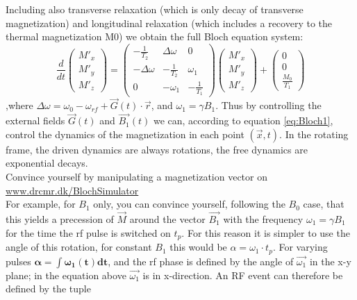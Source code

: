 \documentclass[a4paper,12pt]{extarticle}
\begin{document}
 Including also transverse relaxation (which is only decay of transverse magnetization) and longitudinal relaxation (which includes a recovery to the thermal magnetization M0) we obtain the full Bloch equation system:
\begin{equation} 
\frac{d}{dt}\left( \begin{array}{c} M'_x\\ M'_y\\ M'_z \end{array} \right) 
=
\left( \begin{array}{ccc}
-\frac{1}{T_2}& \Delta\omega & 0\\
-\Delta\omega & -\frac{1}{T_2}& \omega_1\\
0 & -\omega_1 & -\frac{1}{T_1}
\end{array} \right)
\left( \begin{array}{c} M'_x\\ M'_y\\ M'_z \end{array} \right) 
+
\left( \begin{array}{c} 0\\ 0\\ \frac{M_0}{T_1} \end{array} \right)
 \end{equation},where $\Delta\omega = \omega_0-\omega_{rf} + \vec{G}(t)\cdot\vec{r} $, and $\omega_1=\gamma B_1$. 
Thus by controlling the external fields $\vec{G}(t)$ and $\vec {B_1}(t)$ we can, according to equation \eqref{eq:Bloch1}, control the dynamics of the magnetization in each point $(\vec{x},t)$.  In the rotating frame, the driven dynamics are always rotations, the free dynamics are exponential decays.\\
Convince yourself by manipulating a magnetization vector on \href{http://www.drcmr.dk/BlochSimulator/}{www.drcmr.dk/BlochSimulator}\\
For example, for $B_1$ only, you can convince yourself, following the $B_0$ case, that this yields a precession of $\vec{M}$ around the vector $\vec{B_1}$ with the frequency $\omega_1=\gamma B_1$ for the time the rf pulse is switched on $t_p$. For this reason it is simpler to use the angle of this rotation, for constant $B_1$ this would be $\alpha=\omega_1\cdot t_p$. For varying pulses $\mathbf{\alpha=\int{\omega_1(t)dt}}$, and the rf phase is defined by the angle of $\vec{\omega_1}$ in the x-y plane; in the equation above $\vec{\omega_1}$ is in x-direction. An RF event can therefore be defined by the tuple  
 
\end{document}
